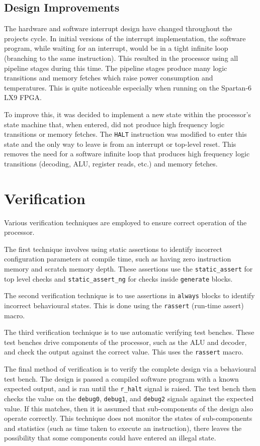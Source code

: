 \subsection{Design Improvements}
The hardware and software interrupt design have changed throughout the projects cycle. In initial versions of the interrupt implementation, the software program, while waiting for an interrupt, would be in a tight infinite loop (branching to the same instruction). This resulted in the processor using all pipeline stages during this time. The pipeline stages produce many logic transitions and memory fetches which raise power consumption and temperatures. This is quite noticeable especially when running on the Spartan-6 LX9 FPGA.

To improve this, it was decided to implement a new state within the processor's state machine that, when entered, did not produce high frequency logic transitions or memory fetches. The \verb|HALT| instruction was modified to enter this state and the only way to leave is from an interrupt or top-level reset. This removes the need for a software infinite loop that produces high frequency logic transitions (decoding, ALU, register reads, etc.) and memory fetches.





\section{Verification}
Various verification techniques are employed to ensure correct operation of the processor.

The first technique involves using static assertions to identify incorrect configuration parameters at compile time, such as having zero instruction memory and scratch memory depth. These assertions use the \verb|static_assert| for top level checks and \verb|static_assert_ng| for checks inside \verb|generate| blocks.

The second verification technique is to use assertions in \verb|always| blocks to identify incorrect behavioural states. This is done using the \verb|rassert| (run-time assert) macro.

The third verification technique is to use automatic verifying test benches. These test benches drive components of the processor, such as the ALU and decoder, and check the output against the correct value. This uses the \verb|rassert| macro.

The final method of verification is to verify the complete design via a behavioural test bench. The design is passed a compiled software program with a known expected output, and is ran until the \verb|r_halt| signal is raised. The test bench then checks the value on the \verb|debug0|, \verb|debug1|, and \verb|debug2| signals against the expected value. If this matches, then it is assumed that sub-components of the design also operate correctly. This technique does not monitor the states of sub-components and statistics (such as time taken to execute an instruction), there leaves the possibility that some components could have entered an illegal state.






